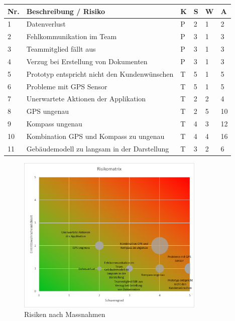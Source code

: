 \documentclass[a4paper]{scrreprt}
\begin{document}
\vspace{1em}
\noindent
\begin{tabularx}{\textwidth}{|l|X|l|l|l||l|}
	\hline
	\textbf{Nr.} & \textbf{Beschreibung / Risiko} & \textbf{K} & \textbf{S} & \textbf{W} & \textbf{A} \\
	\hline
	1 & Datenverlust & P & 2 & 1 & 2\\
	\hline
	2 & Fehlkommunikation im Team & P & 3 & 1 & 3 \\
	\hline
	3 & Teammitglied fällt aus & P & 3 & 1 & 3 \\
	\hline
	4 & Verzug bei Erstellung von Dokumenten & P & 3 & 1 & 3 \\
	\hline
	5 & Prototyp entspricht nicht den Kundenwünschen & T & 5 & 1 & 5 \\
	\hline
	6 & Probleme mit GPS Sensor & T & 5 & 1 & 5 \\
	\hline
	7 & Unerwartete Aktionen der Applikation & T & 2 & 2 & 4\\
	\hline
	8 & GPS ungenau & T & 2 & 5 & 10\\
	\hline
	9 & Kompass ungenau & T & 4 & 3 & 12\\
	\hline
	10 & Kombination GPS und Kompass zu ungenau & T & 4 & 4 & 16\\
	\hline
	11 & Gebäudemodell zu langsam in der Darstellung & T & 3 & 2 & 6\\
	\hline
\end{tabularx}

\vspace{1em}

\begin{figure}[h!]
	\centering
	\includegraphics[keepaspectratio, width=0.8\textwidth]{RisikoMatrix_nach_Massnahmen}
	\caption{Risiken nach Massnahmen}
\end{figure}
\end{document}
